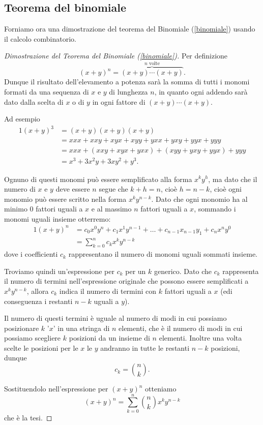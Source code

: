 \subsection{Teorema del binomiale}
Forniamo ora una dimostrazione del teorema del Binomiale (\ref{binomiale}) usando il calcolo combinatorio.
\begin{proof}[Dimostrazione del Teorema del Binomiale (\ref{binomiale})]
    Per definizione \[
        (x + y)^n = \overbrace{(x+y)\cdots (x+y)}^{n \text{ volte}}.
    \] Dunque il risultato dell'elevamento a potenza sarà la somma di tutti i monomi formati da una sequenza di $x$ e $y$ di lunghezza $n$, in quanto ogni addendo sarà dato dalla scelta di $x$ o di $y$ in ogni fattore di $(x+y)\cdots (x+y)$.

    Ad esempio \begin{alignat*}{1}
        (x+y)^3 &= (x+y)(x+y)(x+y) \\
                &= xxx + xxy + xyx + xyy + yxx + yxy + yyx + yyy\\
                &= xxx + (xxy + xyx + yxx) + (xyy + yxy + yyx) + yyy\\
                &= x^3 + 3x^2y + 3xy^2 + y^3.
    \end{alignat*}

    Ognuno di questi monomi può essere semplificato alla forma $x^ky^h$, ma dato che il numero di $x$ e $y$ deve essere $n$ segue che $k + h = n$, cioè $h = n - k$, cioè ogni monomio può essere scritto nella forma $x^ky^{n-k}$. Dato che ogni monomio ha al minimo 0 fattori uguali a $x$ e al massimo $n$ fattori uguali a $x$, sommando i monomi uguali insieme otterremo:
    \begin{alignat*}
        {1}
        (x+y)^n &= c_0x^0y^n + c_1x^1y^{n-1} + \dots + c_{n-1}x_{n-1}y_1 + c_nx^ny^0\\
        &= \sum_{k = 0}^n c_kx^ky^{n-k}
    \end{alignat*}
    dove i coefficienti $c_k$ rappresentano il numero di monomi uguali sommati insieme.

    Troviamo quindi un'espressione per $c_k$ per un $k$ generico. Dato che $c_k$ rappresenta il numero di termini nell'espressione originale che possono essere semplificati a $x^ky^{n-k}$, allora $c_k$ indica il numero di termini con $k$ fattori uguali a $x$ (edi conseguenza i restanti $n-k$ uguali a $y$). 
    
    Il numero di questi termini è uguale al numero di modi in cui possiamo posizionare $k$ '$x$' in una stringa di $n$ elementi, che è il numero di modi in cui possiamo scegliere $k$ posizioni da un insieme di $n$ elementi. Inoltre una volta scelte le posizioni per le $x$ le $y$ andranno in tutte le restanti $n-k$ posizioni, dunque \[
        c_k = \binom{n}{k}.
    \]

    Sostituendolo nell'espressione per $(x+y)^n$ otteniamo \[
        (x+y)^n = \sum_{k = 0}^n \binom{n}{k}x^ky^{n-k}
    \] che è la tesi.
\end{proof}


